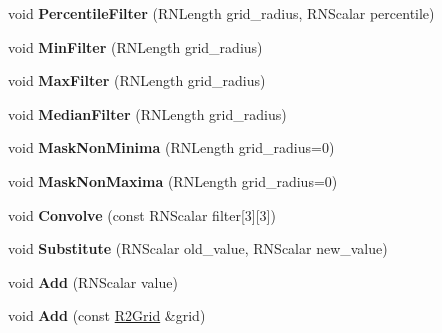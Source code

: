 \begin{DoxyCompactItemize}
\item 
void {\bfseries Percentile\+Filter} (R\+N\+Length grid\+\_\+radius, R\+N\+Scalar percentile)\hypertarget{class_r2_grid_aa940a310e7bd638ae9c118079e375902}{}\label{class_r2_grid_aa940a310e7bd638ae9c118079e375902}

\item 
void {\bfseries Min\+Filter} (R\+N\+Length grid\+\_\+radius)\hypertarget{class_r2_grid_a11742d7b9fd758b08bfd0acf7bdb62ac}{}\label{class_r2_grid_a11742d7b9fd758b08bfd0acf7bdb62ac}

\item 
void {\bfseries Max\+Filter} (R\+N\+Length grid\+\_\+radius)\hypertarget{class_r2_grid_a8a0709f1eaa5f31c02ac38ba9dc987da}{}\label{class_r2_grid_a8a0709f1eaa5f31c02ac38ba9dc987da}

\item 
void {\bfseries Median\+Filter} (R\+N\+Length grid\+\_\+radius)\hypertarget{class_r2_grid_a369b22051996257242565130aaa64396}{}\label{class_r2_grid_a369b22051996257242565130aaa64396}

\item 
void {\bfseries Mask\+Non\+Minima} (R\+N\+Length grid\+\_\+radius=0)\hypertarget{class_r2_grid_aa1e748910b9deced3d1163a0160cb982}{}\label{class_r2_grid_aa1e748910b9deced3d1163a0160cb982}

\item 
void {\bfseries Mask\+Non\+Maxima} (R\+N\+Length grid\+\_\+radius=0)\hypertarget{class_r2_grid_ad0050370c1be4284a3547504bf280683}{}\label{class_r2_grid_ad0050370c1be4284a3547504bf280683}

\item 
void {\bfseries Convolve} (const R\+N\+Scalar filter\mbox{[}3\mbox{]}\mbox{[}3\mbox{]})\hypertarget{class_r2_grid_a3eaad035ffd71c3383e4a8cbaeb1a422}{}\label{class_r2_grid_a3eaad035ffd71c3383e4a8cbaeb1a422}

\item 
void {\bfseries Substitute} (R\+N\+Scalar old\+\_\+value, R\+N\+Scalar new\+\_\+value)\hypertarget{class_r2_grid_a5479d2aceb4cea6cb4611b6256cb7987}{}\label{class_r2_grid_a5479d2aceb4cea6cb4611b6256cb7987}

\item 
void {\bfseries Add} (R\+N\+Scalar value)\hypertarget{class_r2_grid_a4062b8d0c337df580b5ebb304d4975ad}{}\label{class_r2_grid_a4062b8d0c337df580b5ebb304d4975ad}

\item 
void {\bfseries Add} (const \hyperlink{class_r2_grid}{R2\+Grid} \&grid)\hypertarget{class_r2_grid_ad869fb99bea38f7bb71ff2f39ae695c9}{}\label{class_r2_grid_ad869fb99bea38f7bb71ff2f39ae695c9}


\end{DoxyCompactItemize}
